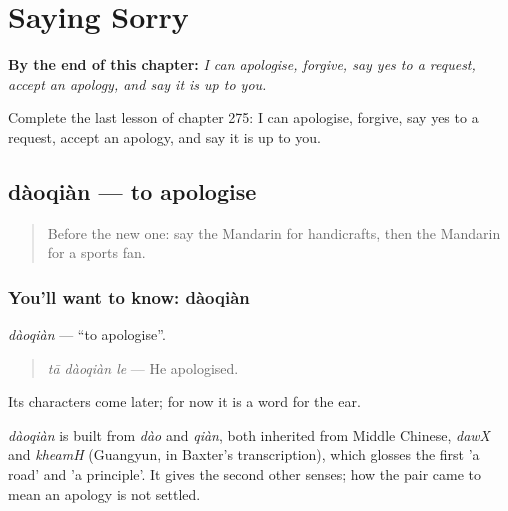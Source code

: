 
\chapter{Saying Sorry}
\label{ch:zh-saying-sorry}

\begin{chapteropening}
\textbf{By the end of this chapter:} \emph{I can apologise, forgive, say yes to a request, accept an apology, and say it is up to you.}

Complete the last lesson of chapter 275: I can apologise, forgive, say yes to a request, accept an apology, and say it is up to you.
\end{chapteropening}

\section[dàoqiàn]{dàoqiàn — to apologise}

\label{lesson:ZH-C275-daoqian}



\begin{quote}
Before the new one: say the Mandarin for handicrafts, then the Mandarin for a sports fan.
\end{quote}

\subsection*{You'll want to know: dàoqiàn}
\emph{dàoqiàn} — \textquotedblleft{}to apologise\textquotedblright{}.

\begin{quote}
\emph{tā dàoqiàn le} — He apologised.
\end{quote}

Its characters come later; for now it is a word for the ear.

\begin{cousinweb}
\emph{dàoqiàn} is built from \emph{dào} and \emph{qiàn}, both inherited from Middle Chinese, \emph{dawX} and \emph{kheamH} (Guangyun, in Baxter's transcription), which glosses the first 'a road' and 'a principle'. It gives the second other senses; how the pair came to mean an apology is not settled.
\end{cousinweb}

